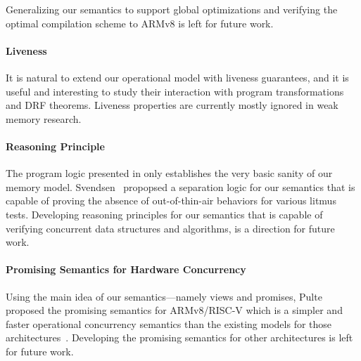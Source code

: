 Generalizing our semantics to support global optimizations and verifying the optimal compilation
scheme to ARMv8 is left for future work.




\paragraph{Liveness}

It is natural to extend our operational model with liveness guarantees,
and it is useful and interesting to study their interaction with
 program transformations and DRF theorems.
Liveness properties are currently mostly ignored in weak memory research.




\paragraph{Reasoning Principle}

The program logic presented in  only establishes the very basic sanity of our
memory model.  Svendsen~ propopsed a separation logic for our
semantics that is capable of proving the absence of out-of-thin-air behaviors for various litmus
tests.  Developing reasoning principles for our semantics that is capable of verifying concurrent
data structures and algorithms, is a direction for future work.


\paragraph{Promising Semantics for Hardware Concurrency}

Using the main idea of our semantics---namely views and promises, Pulte~\etal{} proposed the
promising semantics for ARMv8/RISC-V which is a simpler and faster operational concurrency semantics
than the existing models for those architectures~\cite{promising-arm}.  Developing the promising
semantics for other architectures is left for future work.


